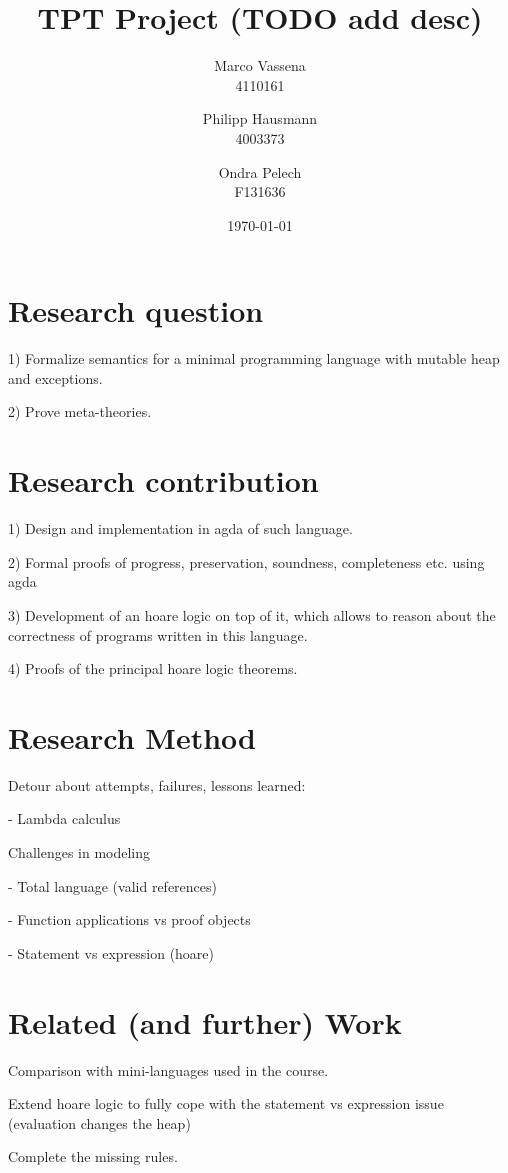 \documentclass[12pt, a4paper, oneside]{article}
\title{TPT Project (TODO add desc)}
\author{Marco Vassena  \\
    4110161 \\
    \and
    Philipp Hausmann \\
    4003373 \\
    \and
    Ondra Pelech \\
    F131636 \\
    }
\date{\today}
\begin{document}
\maketitle

\tableofcontents


\section{Research question}

1) Formalize semantics for a minimal programming language with mutable heap and exceptions.

2) Prove meta-theories.


\section{Research contribution}

1) Design and implementation in agda of such language.

2) Formal proofs of progress, preservation, soundness, completeness etc. using agda 

3) Development of an hoare logic on top of it, which allows to reason about the correctness of programs written in this language. 

4) Proofs of the principal hoare logic theorems.

\section{Research Method}

Detour about attempts, failures, lessons learned:

		- Lambda calculus

		Challenges in modeling

			- Total language (valid references)

			- Function applications vs proof objects

			- Statement vs expression (hoare)


\section{Related (and further) Work}

Comparison with mini-languages used in the course.

Extend hoare logic to fully cope with the statement vs expression issue (evaluation changes the heap) 

Complete the missing rules. 
\end{document}
